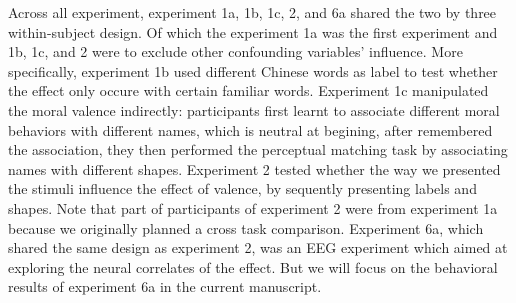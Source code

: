 \documentclass[
  man]{apa6}
\begin{document}
Across all experiment, experiment 1a, 1b, 1c, 2, and 6a shared the two by three within-subject design. Of which the experiment 1a was the first experiment and 1b, 1c, and 2 were to exclude other confounding variables' influence. More specifically, experiment 1b used different Chinese words as label to test whether the effect only occure with certain familiar words. Experiment 1c manipulated the moral valence indirectly: participants first learnt to associate different moral behaviors with different names, which is neutral at begining, after remembered the association, they then performed the perceptual matching task by associating names with different shapes. Experiment 2 tested whether the way we presented the stimuli influence the effect of valence, by sequently presenting labels and shapes. Note that part of participants of experiment 2 were from experiment 1a because we originally planned a cross task comparison. Experiment 6a, which shared the same design as experiment 2, was an EEG experiment which aimed at exploring the neural correlates of the effect. But we will focus on the behavioral results of experiment 6a in the current manuscript.
\end{document}
